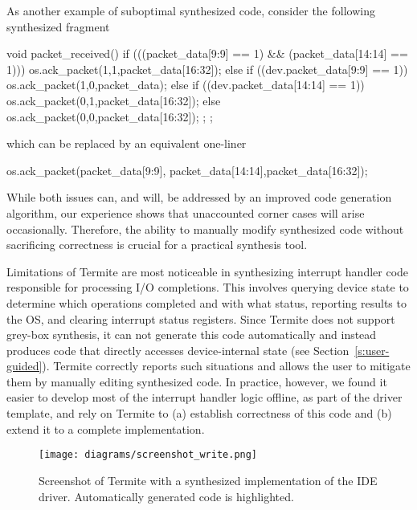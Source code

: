 \documentclass[a4paper,twoside,openright,11pt]{book}
\newcommand{\termite}{Termite\xspace}
\theoremstyle{definition}
\begin{document}
As another example of suboptimal synthesized code, consider the following synthesized fragment

\begin{tsllisting}[frame=single]
void packet_received() {
  if (((packet_data[9:9] == 1) && 
       (packet_data[14:14] == 1))) {
    os.ack_packet(1,1,packet_data[16:32]);
  } else if ((dev.packet_data[9:9] == 1)) {
    os.ack_packet(1,0,packet_data);
  } else if ((dev.packet_data[14:14] == 1)) {
    os.ack_packet(0,1,packet_data[16:32]);
  } else {
    os.ack_packet(0,0,packet_data[16:32]);
  };
};
\end{tsllisting}

which can be replaced by an equivalent one-liner

\begin{tsllisting}[frame=single]
os.ack_packet(packet_data[9:9],
    packet_data[14:14],packet_data[16:32]);
\end{tsllisting}

\noindent While both issues can, and will, be addressed by an improved code generation algorithm, our experience shows that unaccounted corner cases will arise occasionally.  Therefore, the ability to manually modify synthesized code without sacrificing correctness is crucial for a practical synthesis tool.

Limitations of \termite are most noticeable in synthesizing interrupt handler code responsible for processing I/O completions.  This involves querying device state to determine which operations completed and with what status, reporting results to the OS, and clearing interrupt status registers.  Since \termite does not support grey-box synthesis, it can not generate this code automatically and instead produces code that directly accesses device-internal state (see Section~\ref{s:user-guided}).  \termite correctly reports such situations and allows the user to mitigate them by manually editing synthesized code.  In practice, however, we found it easier to develop most of the interrupt handler logic offline, as part of the driver template, and rely on \termite to (a) establish correctness of this code and (b) extend it to a complete implementation.

\begin{figure}
    \center
    \texttt{[image: diagrams/screenshot\_write.png]}
    \caption{Screenshot of \termite with a synthesized implementation of the IDE driver.  Automatically generated code is highlighted.}
    \label{f:screenshot_write}
\end{figure}
\end{document}
